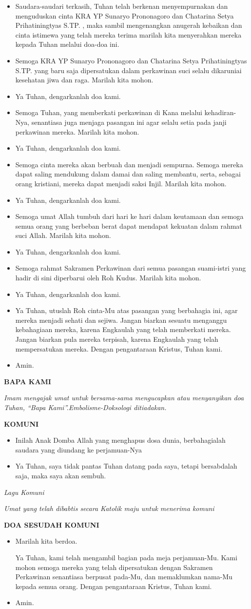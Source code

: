 \documentclass[a5paper,titlepage,11pt,openany]{scrbook}
\makeatletter
\newcommand{\subjudul}[1]{%
  {\parindent \z@ 
    \interlinepenalty\@M \large \bfseries #1\par\nobreak \vskip 10\p@ }}
\newcommand{\lagu}[1]{%
  {\parindent \z@ 
    \interlinepenalty\@M \slshape \mdseries \Large \textit{#1}\par\nobreak \vskip 40\p@ }}
\newcommand{\BU}[1]{\begin{itemize} \item[U:] #1 \end{itemize}}
\newcommand{\BI}[1]{\begin{itemize} \item[I:] #1 \end{itemize}}
\newcommand{\BP}[1]{\begin{itemize} \item[P:] #1 \end{itemize}}
\newcommand{\camantri}{Chatarina Setya Prihatiningtyas S.TP. }
\newcommand{\camantra}{KRA YP Sunaryo Prononagoro }
\makeatother
\begin{document}
\BI{Saudara-saudari terkasih, Tuhan telah berkenan menyempurnakan dan menguduskan cinta \camantra dan \camantri, maka sambil mengenangkan anugerah kebaikan dan cinta istimewa yang telah mereka terima marilah kita menyerahkan mereka kepada Tuhan melalui doa-doa ini.}
\BP{Semoga \camantra dan \camantri yang baru saja dipersatukan dalam perkawinan suci selalu dikaruniai kesehatan jiwa dan raga. Marilah kita mohon.}
\BU{Ya Tuhan, dengarkanlah doa kami.}
\BP{Semoga Tuhan, yang memberkati perkawinan di Kana melalui kehadiran-Nya, senantiasa juga menjaga pasangan ini agar selalu setia pada janji perkawinan mereka. Marilah kita mohon.}
\BU{Ya Tuhan, dengarkanlah doa kami.}
\BP{Semoga cinta mereka akan berbuah dan menjadi sempurna. Semoga mereka dapat saling mendukung dalam damai dan saling membantu, serta, sebagai orang kristiani, mereka dapat menjadi saksi Injil.  Marilah kita mohon.}
\BU{Ya Tuhan, dengarkanlah doa kami.}
\BP{Semoga umat Allah tumbuh dari hari ke hari dalam keutamaan dan semoga semua orang yang berbeban berat dapat mendapat kekuatan dalam rahmat suci Allah. Marilah kita mohon.}
\BU{Ya Tuhan, dengarkanlah doa kami.}
\BP{Semoga rahmat Sakramen Perkawinan dari semua pasangan suami-istri yang hadir di sini diperbarui oleh Roh Kudus. Marilah kita mohon.}
\BU{Ya Tuhan, dengarkanlah doa kami.}
\BI{Ya Tuhan, utuslah Roh cinta-Mu atas pasangan yang berbahagia ini, agar mereka menjadi sehati dan sejiwa. Jangan biarkan sesuatu menganggu kebahagiaan mereka, karena Engkaulah yang telah memberkati mereka. Jangan biarkan pula mereka terpisah, karena Engkaulah yang telah mempersatukan mereka. Dengan pengantaraan Kristus, Tuhan kami.}
\BU{Amin.}




\subjudul{BAPA KAMI}

\textit{Imam mengajak umat untuk bersama-sama mengucapkan atau menyanyikan doa Tuhan, “Bapa Kami”.Embolisme-Doksologi ditiadakan.}



\subjudul{KOMUNI}

\BI{Inilah Anak Domba Allah yang menghapus dosa dunia, berbahagialah saudara
yang diundang ke perjamuan-Nya}
\BU{Ya Tuhan, saya tidak pantas Tuhan datang pada saya, tetapi bersabdalah saja,
maka saya akan sembuh.}

\lagu{Lagu Komuni}

\textit{Umat yang telah dibabtis secara Katolik maju untuk menerima komuni}

\subjudul{DOA SESUDAH KOMUNI}

\BI{Marilah kita berdoa.
  
          Ya Tuhan, kami telah mengambil bagian pada meja perjamuan-Mu. Kami mohon semoga mereka yang telah dipersatukan dengan Sakramen Perkawinan senantiasa berpusat pada-Mu, dan memaklumkan nama-Mu kepada semua orang. Dengan pengantaraan Kristus, Tuhan kami.}
\BU{Amin.}
\end{document}

